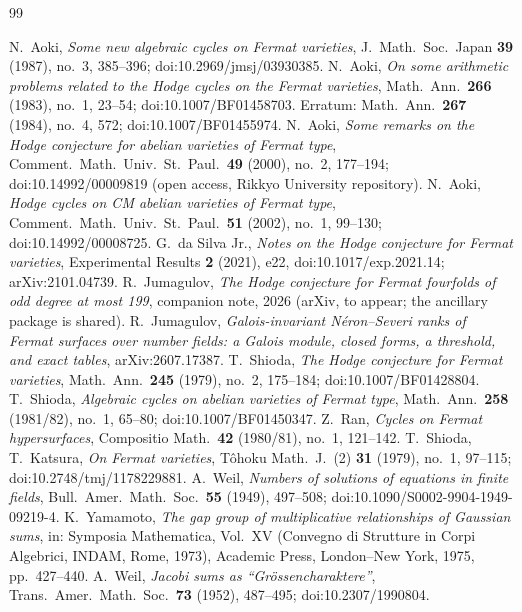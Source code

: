 \documentclass[11pt]{amsart}
\theoremstyle{remark}
\begin{document}
\begin{thebibliography}{99}
\raggedright
{} N.~Aoki, \emph{Some new algebraic cycles on Fermat varieties}, J.~Math.\ Soc.\ Japan
\textbf{39} (1987), no.~3, 385--396; doi:10.2969/jmsj/03930385.
 N.~Aoki, \emph{On some arithmetic problems related to the Hodge cycles on the
Fermat varieties}, Math.\ Ann.\ \textbf{266} (1983), no.~1, 23--54;
doi:10.1007/BF01458703. Erratum: Math.\ Ann.\ \textbf{267} (1984), no.~4, 572;
doi:10.1007/BF01455974.
 N.~Aoki, \emph{Some remarks on the Hodge conjecture for abelian varieties of Fermat
type}, Comment.\ Math.\ Univ.\ St.\ Paul.\ \textbf{49} (2000), no.~2, 177--194;
doi:10.14992/00009819 (open access, Rikkyo University repository).
 N.~Aoki, \emph{Hodge cycles on CM abelian varieties of Fermat type}, Comment.\
Math.\ Univ.\ St.\ Paul.\ \textbf{51} (2002), no.~1, 99--130; doi:10.14992/00008725.
\bibitem{daSilva} G.~da Silva Jr., \emph{Notes on the Hodge conjecture for Fermat varieties},
Experimental Results \textbf{2} (2021), e22, doi:10.1017/exp.2021.14; arXiv:2101.04739.
\bibitem{BN} R.~Jumagulov, \emph{The Hodge conjecture for Fermat fourfolds of odd degree at
most 199}, companion note, 2026 (arXiv, to appear; the ancillary package is shared).
\bibitem{P1} R.~Jumagulov, \emph{Galois-invariant N\'eron--Severi ranks of Fermat surfaces over
number fields: a Galois module, closed forms, a threshold, and exact tables}, arXiv:2607.17387.
\bibitem{Shioda79} T.~Shioda, \emph{The Hodge conjecture for Fermat varieties}, Math.\ Ann.\ \textbf{245}
(1979), no.~2, 175--184; doi:10.1007/BF01428804.
 T.~Shioda, \emph{Algebraic cycles on abelian varieties of Fermat type}, Math.\
Ann.\ \textbf{258} (1981/82), no.~1, 65--80; doi:10.1007/BF01450347.
\bibitem{Ran} Z.~Ran, \emph{Cycles on Fermat hypersurfaces}, Compositio Math.\ \textbf{42}
(1980/81), no.~1, 121--142.
\bibitem{SK} T.~Shioda, T.~Katsura, \emph{On Fermat varieties}, T\^ohoku Math.\ J.\ (2)
\textbf{31} (1979), no.~1, 97--115; doi:10.2748/tmj/1178229881.
\bibitem{Weil49} A.~Weil, \emph{Numbers of solutions of equations in finite fields}, Bull.\ Amer.\
Math.\ Soc.\ \textbf{55} (1949), 497--508; doi:10.1090/S0002-9904-1949-09219-4.
\bibitem{Yamamoto} K.~Yamamoto, \emph{The gap group of multiplicative relationships of Gaussian
sums}, in: Symposia Mathematica, Vol.~XV (Convegno di Strutture in Corpi Algebrici, INDAM, Rome,
1973), Academic Press, London--New York, 1975, pp.~427--440.
\bibitem{Weil52} A.~Weil, \emph{Jacobi sums as ``Gr\"ossencharaktere''}, Trans.\ Amer.\ Math.\ Soc.\
\textbf{73} (1952), 487--495; doi:10.2307/1990804.
\end{thebibliography}
\end{document}
